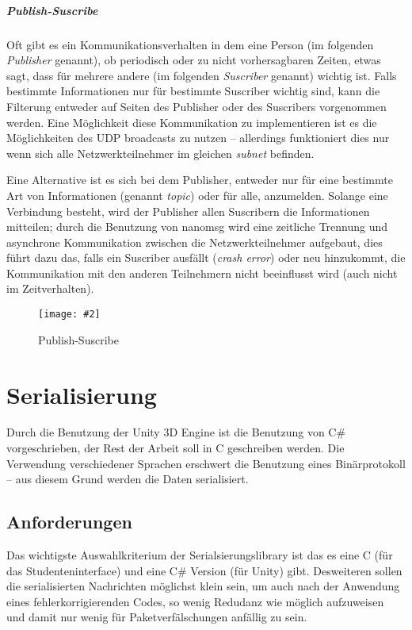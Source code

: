 \documentclass[
    12pt,
    bibliography=totoc,
    ngerman,
	enabledeprecatedfontcommands
]{scrartcl}
\newcommand{\includevisio}[2][]{\texttt{[image: \#2]}}
\begin{document}
\subparagraph{Publish-Suscribe} Oft gibt es ein Kommunikationsverhalten in dem eine Person (im folgenden \textit{Publisher} genannt), ob periodisch oder zu nicht vorhersagbaren Zeiten, etwas sagt,
dass f{\"{u}}r mehrere andere (im folgenden \textit{Suscriber} genannt) wichtig ist. Falls bestimmte Informationen nur f{\"{u}}r bestimmte Suscriber wichtig sind, kann die Filterung entweder auf Seiten des Publisher oder des Suscribers vorgenommen werden.
Eine M{\"{o}}glichkeit diese Kommunikation zu implementieren ist es die M{\"{o}}glichkeiten des UDP broadcasts zu nutzen -- allerdings funktioniert dies nur wenn sich alle Netzwerkteilnehmer im gleichen
\textit{subnet} befinden.

Eine Alternative ist es sich bei dem Publisher, entweder nur f{\"{u}}r eine bestimmte Art von Informationen (genannt \textit{topic}) oder f{\"{u}}r alle, anzumelden. Solange eine Verbindung besteht,
wird der Publisher allen Suscribern die Informationen mitteilen; durch die Benutzung von nanomsg wird eine zeitliche Trennung und asynchrone Kommunikation zwischen die Netzwerkteilnehmer aufgebaut,
dies f{\"{u}}hrt dazu das, falls ein Suscriber ausf{\"{a}}llt (\textit{crash error}) oder neu hinzukommt, die Kommunikation mit den anderen Teilnehmern nicht beeinflusst wird (auch nicht im Zeitverhalten).
\begin{figure}
	\centering
	\includevisio[width=\textwidth]{pubsub}
	\caption{Publish-Suscribe}
	\label{fig:pubsub}
\end{figure}

\clearpage
\section{Serialisierung}
Durch die Benutzung der Unity 3D Engine ist die Benutzung von C\# vorgeschrieben, der Rest der Arbeit soll in C geschreiben werden. Die Verwendung verschiedener Sprachen erschwert die Benutzung eines
Bin{\"{a}}rprotokoll -- aus diesem Grund werden die Daten serialisiert.

\subsection{Anforderungen}
Das wichtigste Auswahlkriterium der Serialsierungslibrary ist das es eine C (f{\"{u}}r das Studenteninterface) und eine C\# Version (f{\"{u}}r Unity) gibt.
Desweiteren sollen die serialisierten Nachrichten m{\"{o}}glichst klein sein, um auch nach der Anwendung
eines fehlerkorrigierenden Codes, so wenig Redudanz wie m{\"{o}}glich aufzuweisen und damit nur wenig f{\"{u}}r Paketverf{\"{a}}lschungen anf{\"{a}}llig zu sein.
\end{document}
